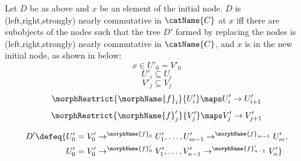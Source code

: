 \documentclass{article}
\begin{document}
\begin{definition}
\label{def:NCDp}
Let $D$ be as above and $x$ be an element of the initial node. $D$ is
(left,right,strongly) nearly commutative in $\catName{C}$ at $x$ iff
there are subobjects of the nodes such that the tree $D'$ formed by
replacing the nodes is (left,right,strongly) nearly commutative in
$\catName{C}$, and $x$ is in the new initial node, as shown in
 below:
\begin{equation}
x \in U'_0 = V'_0
\end{equation}
\begin{equation}
U'_i \subseteq U_i
\end{equation}
\begin{equation}
V'_j \subseteq V_j
\end{equation}
\begin{equation}
\morphRestrict{\morphName{f}_i}{U'_i} \maps U'_i \to U'_{i+1}
\end{equation}
\begin{equation}
\morphRestrict{\morphName{f}'_j}{V'_j} \maps V'_j \to V'_{j+1}
\end{equation}

\begin{equation}
\begin{split}
\label{eq:NCDp}
D' \defeq \{
  &
    U'_0 = V'_0 \to^{\morphName{f}_0} U'_1,
    \dotsc,
    U'_{m-1} \to^{\morphName{f}_{m-1}} U'_m,
\\
  &
    U'_0 = V'_0 \to^{\morphName{f}'_0} V'_1,
    \dotsc,
    V'_{n-1} \to^{\morphName{f}'_{n-1}} V'_n
\}
\end{split}
\end{equation}
\end{definition}
\end{document}
